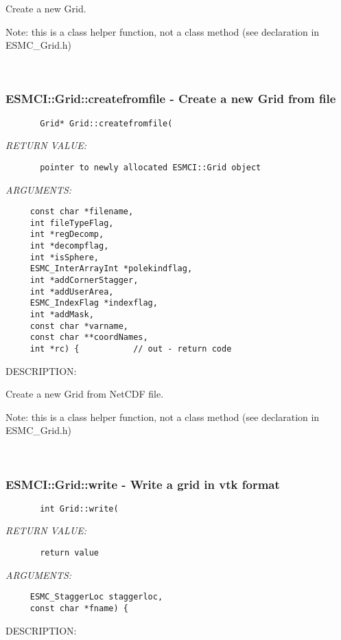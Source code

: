         Create a new Grid.
  
        Note: this is a class helper function, not a class method
        (see declaration in ESMC\_Grid.h)
   
 
\mbox{}\hrulefill\ 
 
\subsubsection [ESMCI::Grid::createfromfile] {ESMCI::Grid::createfromfile - Create a new Grid from file}


  
\begin{verbatim}       Grid* Grid::createfromfile(\end{verbatim}{\em RETURN VALUE:}
\begin{verbatim}       pointer to newly allocated ESMCI::Grid object\end{verbatim}{\em ARGUMENTS:}
\begin{verbatim}     const char *filename,
     int fileTypeFlag,
     int *regDecomp,
     int *decompflag,
     int *isSphere,
     ESMC_InterArrayInt *polekindflag,
     int *addCornerStagger,
     int *addUserArea,
     ESMC_IndexFlag *indexflag,
     int *addMask,
     const char *varname,
     const char **coordNames,
     int *rc) {           // out - return code\end{verbatim}
{\sf DESCRIPTION:\\ }


        Create a new Grid from NetCDF file.
  
        Note: this is a class helper function, not a class method
        (see declaration in ESMC\_Grid.h)
   
 
\mbox{}\hrulefill\ 
 
\subsubsection [ESMCI::Grid::write] {ESMCI::Grid::write - Write a grid in vtk format}


  
\begin{verbatim}       int Grid::write(\end{verbatim}{\em RETURN VALUE:}
\begin{verbatim}       return value\end{verbatim}{\em ARGUMENTS:}
\begin{verbatim}     ESMC_StaggerLoc staggerloc,
     const char *fname) {\end{verbatim}
{\sf DESCRIPTION:\\ }


